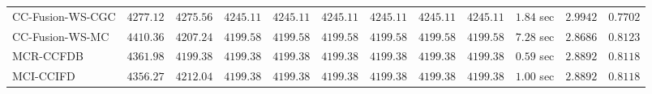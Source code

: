 \begin{table}[H]
\begin{tabular}{lrrrrrrrrrrr}
    CC-Fusion-WS-CGC & $      4277.12$ & $      4275.56$ & $      4245.11$ & $      4245.11$ & $      4245.11$ & $      4245.11$ & $      4245.11$ & $      4245.11$ & $         1.84$ sec    & $       2.9942$  & $       0.7702$ \\ 
     CC-Fusion-WS-MC & $      4410.36$ & $      4207.24$ & $      4199.58$ & $      4199.58$ & $      4199.58$ & $      4199.58$ & $      4199.58$ & $      4199.58$ & $         7.28$ sec    & $       2.8686$  & $       0.8123$ \\ 
\cmidrule{1-1} 
           MCR-CCFDB & $      4361.98$ & $      4199.38$ & $      4199.38$ & $      4199.38$ & $      4199.38$ & $      4199.38$ & $      4199.38$ & $      4199.38$ & $         0.59$ sec    & $       2.8892$  & $       0.8118$ \\ 
\cmidrule{1-1} 
           MCI-CCIFD & $      4356.27$ & $      4212.04$ & $      4199.38$ & $      4199.38$ & $      4199.38$ & $      4199.38$ & $      4199.38$ & $      4199.38$ & $         1.00$ sec    & $       2.8892$  & $       0.8118$ \\ 
\bottomrule
\end{tabular}
\end{table}

